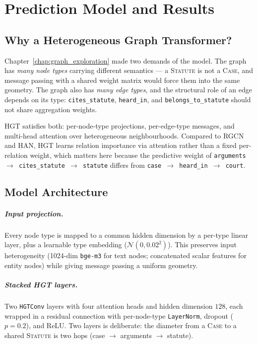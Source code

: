 \chapter{Prediction Model and Results}
\label{chap:results}

\section{Why a Heterogeneous Graph Transformer?}

Chapter~\ref{chap:graph_exploration} made two demands of the model. The graph has \emph{many node types} carrying different semantics --- a \textsc{Statute} is not a \textsc{Case}, and message passing with a shared weight matrix would force them into the same geometry. The graph also has \emph{many edge types}, and the structural role of an edge depends on its type: \texttt{cites\_statute}, \texttt{heard\_in}, and \texttt{belongs\_to\_statute} should not share aggregation weights.

HGT satisfies both: per-node-type projections, per-edge-type messages, and multi-head attention over heterogeneous neighbourhoods. Compared to RGCN and HAN, HGT learns relation importance via attention rather than a fixed per-relation weight, which matters here because the predictive weight of \texttt{arguments\,$\to$\,cites\_statute\,$\to$\,statute} differs from \texttt{case\,$\to$\,heard\_in\,$\to$\,court}.

\section{Model Architecture}

\paragraph{Input projection.} Every node type is mapped to a common hidden dimension by a per-type linear layer, plus a learnable type embedding ($\mathcal{N}(0,0.02^2)$). This preserves input heterogeneity (1024-dim \texttt{bge-m3} for text nodes; concatenated scalar features for entity nodes) while giving message passing a uniform geometry.

\paragraph{Stacked HGT layers.} Two \texttt{HGTConv} layers with four attention heads and hidden dimension $128$, each wrapped in a residual connection with per-node-type \texttt{LayerNorm}, dropout ($p=0.2$), and ReLU. Two layers is deliberate: the diameter from a \textsc{Case} to a shared \textsc{Statute} is two hops (case $\to$ arguments $\to$ statute).

